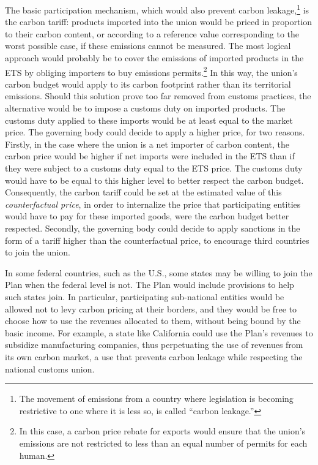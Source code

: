 \documentclass[a5paper,english,openany]{memoir}
\begin{document}
The basic participation mechanism, which would also prevent carbon leakage,\footnote{The movement of emissions from a country where legislation is becoming restrictive to one where it is less so, is called ``carbon leakage.''} is the carbon tariff: %
products imported into the union would be priced in proportion to their carbon content, or according to a reference value corresponding to the worst possible case, if these emissions cannot be measured. %
The most logical approach would probably be to cover the emissions of imported products in the ETS by obliging importers to buy emissions permits.\footnote{In this case, a carbon price rebate for exports would ensure that the union's emissions are not restricted to less than an equal number of permits for each human.} In this way, the union's carbon budget would apply to its carbon footprint rather than its territorial emissions. Should this solution prove too far removed from customs practices, the alternative would be to impose a customs duty on imported products. The customs duty applied to these imports would be at least equal to the market price. The governing body could decide to apply a higher price, for two reasons. Firstly, in the case where the union is a net importer of carbon content, the carbon price would be higher if net imports were included in the ETS than if they were subject to a customs duty equal to the ETS price. The customs duty would have to be equal to this higher level to better respect the carbon budget. Consequently, the carbon tariff could be set at the estimated value %
of this \textit{counterfactual price}, in order to internalize the price that participating entities would have to pay for these imported goods, were the carbon budget better respected. Secondly, the governing body could decide to apply sanctions in the form of a tariff higher than the counterfactual price, to encourage third countries to join the union. 

In some federal countries, such as the U.S., some states may be willing to join the Plan when the federal level is not. The Plan would include provisions to help such states join. In particular, participating sub-national entities would be allowed not to levy carbon pricing at their borders, and they would be free to choose how to use the revenues allocated to them, without being bound by the basic income. 
For example, a state like California could use the Plan's revenues to subsidize %
manufacturing companies, thus perpetuating the use of revenues from its own carbon market, a use that prevents carbon leakage while respecting the national customs union.
\end{document}
